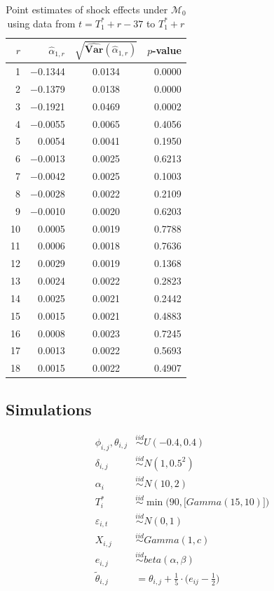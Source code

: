 \documentclass[11pt]{article}
\newcommand{\simiid}{\stackrel{iid}{\sim}} %
\def\mc#1{\mathcal{#1}} %
\def\mc#1{\mathcal{#1}}
\theoremstyle{definition}
\begin{document}
\begin{table}[H]
	\caption{Point estimates of shock effects under $\mc{M}_0$ using data from $t = T_1^* + r-37$ to $T^*_1 + r$} \label{pesr}
	\begin{center}
		\begin{tabular}{rrcr} 
 $r$& $\hat{\alpha}_{1,r}$ & $\sqrt{\hat{\mathbf{Var}}(\hat{\alpha}_{1,r})}$ & $p$-value \\ 
  \hline
 1 & $-$0.1344 & 0.0134 & 0.0000 \\ 
  2 & $-$0.1379 & 0.0138 & 0.0000 \\ 
  3 & $-$0.1921 & 0.0469 & 0.0002 \\ 
  4 & $-$0.0055 & 0.0065 & 0.4056 \\ 
  5 & 0.0054 & 0.0041 & 0.1950 \\ 
  6 & $-$0.0013 & 0.0025 & 0.6213 \\ 
  7 & $-$0.0042 & 0.0025 & 0.1003 \\ 
  8 & $-$0.0028 & 0.0022 & 0.2109 \\ 
  9 & $-$0.0010 & 0.0020 & 0.6203 \\ 
  10 & 0.0005 & 0.0019 & 0.7788 \\ 
  11 & 0.0006 & 0.0018 & 0.7636 \\ 
  12 & 0.0029 & 0.0019 & 0.1368 \\ 
  13 & 0.0024 & 0.0022 & 0.2823 \\ 
  14 & 0.0025 & 0.0021 & 0.2442 \\ 
  15 & 0.0015 & 0.0021 & 0.4883 \\ 
  16 & 0.0008 & 0.0023 & 0.7245 \\ 
  17 & 0.0013 & 0.0022 & 0.5693 \\ 
  18 & 0.0015 & 0.0022 & 0.4907 \\ 
   \hline
\end{tabular}
	\end{center}	
\end{table}



\subsection{Simulations}
\label{simulation}


\begin{align*}
	\phi_{i,j}, \theta_{i,j}  & \simiid U(-0.4,0.4) \\ 
	\delta_{i,j} & \simiid N(1,0.5^2) \\
	\alpha_i & \simiid N(10, 2) \\
	T_i^* & \simiid \min\Big(90, \big[Gamma(15,10)\big]\Big) \\
	\varepsilon_{i,t} & \simiid N(0,1)\\
	X_{i,j} & \simiid Gamma(1,c) \\
	e_{i,j} & \simiid beta(\alpha, \beta) \\
	\tilde{\theta}_{i,j}&= \theta_{i,j} + \frac{1}{5}\cdot \Big(e_{ij}-\frac{1}{2}\Big)
\end{align*}
\end{document}
